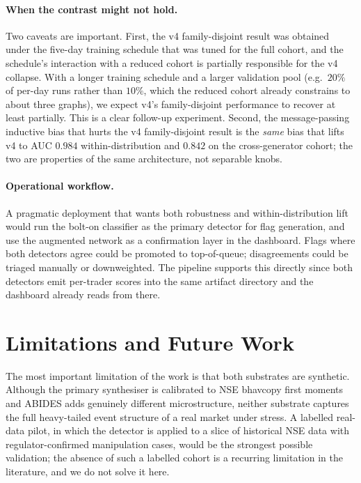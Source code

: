 \documentclass[10pt,twocolumn,letterpaper]{article}
\begin{document}
\paragraph{When the contrast might not hold.} Two caveats are
important. First, the v4 family-disjoint result was obtained under the
five-day training schedule that was tuned for the full cohort, and the
schedule's interaction with a reduced cohort is partially responsible
for the v4 collapse. With a longer training schedule and a larger
validation pool (e.g.\ \(20\%\) of per-day runs rather than \(10\%\),
which the reduced cohort already constrains to about three graphs), we
expect v4's family-disjoint performance to recover at least partially.
This is a clear follow-up experiment. Second, the message-passing
inductive bias that hurts the v4 family-disjoint result is the
\emph{same} bias that lifts v4 to AUC \(0.984\) within-distribution and
\(0.842\) on the cross-generator cohort; the two are properties of the
same architecture, not separable knobs.

\paragraph{Operational workflow.} A pragmatic deployment that wants
both robustness and within-distribution lift would run the bolt-on
classifier as the primary detector for flag generation, and use the
augmented network as a confirmation layer in the dashboard. Flags
where both detectors agree could be promoted to top-of-queue;
disagreements could be triaged manually or downweighted. The pipeline
supports this directly since both detectors emit per-trader scores
into the same artifact directory and the dashboard already reads from
there.

\section{Limitations and Future Work}
\label{sec:lim}

The most important limitation of the work is that both substrates are
synthetic. Although the primary synthesiser is calibrated to NSE
bhavcopy first moments and ABIDES adds genuinely different
microstructure, neither substrate captures the full heavy-tailed
event structure of a real market under stress. A labelled real-data
pilot, in which the detector is applied to a slice of historical NSE
data with regulator-confirmed manipulation cases, would be the
strongest possible validation; the absence of such a labelled cohort is
a recurring limitation in the literature, and we do not solve it here.
\end{document}
